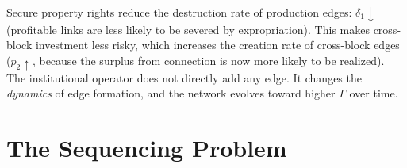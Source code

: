 \documentclass[../structural_economics_book.tex]{subfiles}
\begin{document}
\begin{example}\label{ch15:ex:property}
Secure property rights reduce the destruction rate of production edges: $\delta_1 \downarrow$ (profitable links are less likely to be severed by expropriation). This makes cross-block investment less risky, which increases the creation rate of cross-block edges ($p_2 \uparrow$, because the surplus from connection is now more likely to be realized). The institutional operator does not directly add any edge. It changes the \textit{dynamics} of edge formation, and the network evolves toward higher $\Gamma$ over time.
\end{example}


\section{The Sequencing Problem}
\label{ch15:sec:sequencing}
\end{document}
